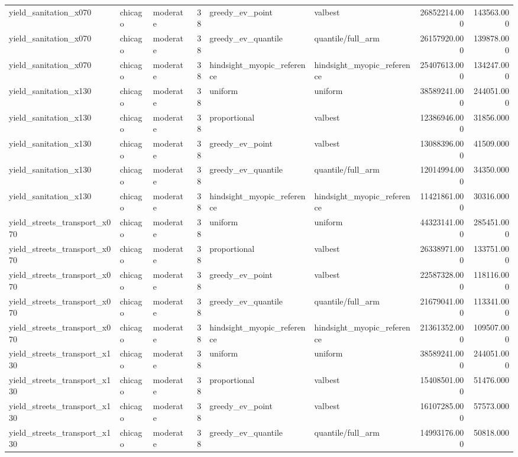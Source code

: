 \begin{tabular}{lllrllrr}
yield\_sanitation\_x070 & chicago & moderate & 38 & greedy\_ev\_point & valbest & 26852214.000 & 143563.000 \\
yield\_sanitation\_x070 & chicago & moderate & 38 & greedy\_ev\_quantile & quantile/full\_arm & 26157920.000 & 139878.000 \\
yield\_sanitation\_x070 & chicago & moderate & 38 & hindsight\_myopic\_reference & hindsight\_myopic\_reference & 25407613.000 & 134247.000 \\
yield\_sanitation\_x130 & chicago & moderate & 38 & uniform & uniform & 38589241.000 & 244051.000 \\
yield\_sanitation\_x130 & chicago & moderate & 38 & proportional & valbest & 12386946.000 & 31856.000 \\
yield\_sanitation\_x130 & chicago & moderate & 38 & greedy\_ev\_point & valbest & 13088396.000 & 41509.000 \\
yield\_sanitation\_x130 & chicago & moderate & 38 & greedy\_ev\_quantile & quantile/full\_arm & 12014994.000 & 34350.000 \\
yield\_sanitation\_x130 & chicago & moderate & 38 & hindsight\_myopic\_reference & hindsight\_myopic\_reference & 11421861.000 & 30316.000 \\
yield\_streets\_transport\_x070 & chicago & moderate & 38 & uniform & uniform & 44323141.000 & 285451.000 \\
yield\_streets\_transport\_x070 & chicago & moderate & 38 & proportional & valbest & 26338971.000 & 133751.000 \\
yield\_streets\_transport\_x070 & chicago & moderate & 38 & greedy\_ev\_point & valbest & 22587328.000 & 118116.000 \\
yield\_streets\_transport\_x070 & chicago & moderate & 38 & greedy\_ev\_quantile & quantile/full\_arm & 21679041.000 & 113341.000 \\
yield\_streets\_transport\_x070 & chicago & moderate & 38 & hindsight\_myopic\_reference & hindsight\_myopic\_reference & 21361352.000 & 109507.000 \\
yield\_streets\_transport\_x130 & chicago & moderate & 38 & uniform & uniform & 38589241.000 & 244051.000 \\
yield\_streets\_transport\_x130 & chicago & moderate & 38 & proportional & valbest & 15408501.000 & 51476.000 \\
yield\_streets\_transport\_x130 & chicago & moderate & 38 & greedy\_ev\_point & valbest & 16107285.000 & 57573.000 \\
yield\_streets\_transport\_x130 & chicago & moderate & 38 & greedy\_ev\_quantile & quantile/full\_arm & 14993176.000 & 50818.000 \\

\end{tabular}

